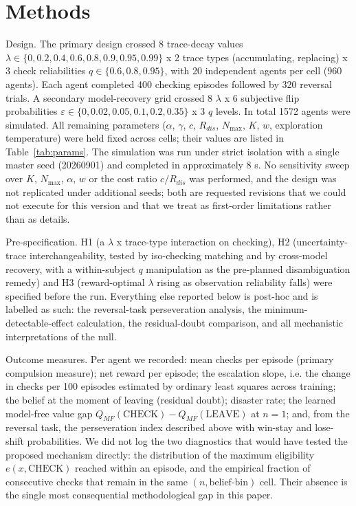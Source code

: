 \documentclass[11pt,a4paper]{article}
\begin{document}
\section{Methods}
Design. The primary design crossed 8 trace-decay values $\lambda \in \{0, 0.2, 0.4, 0.6, 0.8, 0.9, 0.95, 0.99\}$ x 2 trace types (accumulating, replacing) x 3 check reliabilities $q \in \{0.6, 0.8, 0.95\}$, with 20 independent agents per cell (960 agents). Each agent completed 400 checking episodes followed by 320 reversal trials. A secondary model-recovery grid crossed 8 $\lambda$ x 6 subjective flip probabilities $\varepsilon \in \{0, 0.02, 0.05, 0.1, 0.2, 0.35\}$ x 3 $q$ levels. In total 1572 agents were simulated. All remaining parameters ($\alpha$, $\gamma$, $c$, $R_{dis}$, $N_{\max}$, $K$, $w$, exploration temperature) were held fixed across cells; their values are listed in Table~\ref{tab:params}. The simulation was run under strict isolation with a single master seed (20260901) and completed in approximately 8 s. No sensitivity sweep over $K$, $N_{\max}$, $\alpha$, $w$ or the cost ratio $c/R_{dis}$ was performed, and the design was not replicated under additional seeds; both are requested revisions that we could not execute for this version and that we treat as first-order limitations rather than as details.

Pre-specification. H1 (a $\lambda$ x trace-type interaction on checking), H2 (uncertainty-trace interchangeability, tested by iso-checking matching and by cross-model recovery, with a within-subject $q$ manipulation as the pre-planned disambiguation remedy) and H3 (reward-optimal $\lambda$ rising as observation reliability falls) were specified before the run. Everything else reported below is post-hoc and is labelled as such: the reversal-task perseveration analysis, the minimum-detectable-effect calculation, the residual-doubt comparison, and all mechanistic interpretations of the null.

Outcome measures. Per agent we recorded: mean checks per episode (primary compulsion measure); net reward per episode; the escalation slope, i.e. the change in checks per 100 episodes estimated by ordinary least squares across training; the belief at the moment of leaving (residual doubt); disaster rate; the learned model-free value gap $Q_{MF}(\mathrm{CHECK}) - Q_{MF}(\mathrm{LEAVE})$ at $n=1$; and, from the reversal task, the perseveration index described above with win-stay and lose-shift probabilities. We did not log the two diagnostics that would have tested the proposed mechanism directly: the distribution of the maximum eligibility $e(x,\mathrm{CHECK})$ reached within an episode, and the empirical fraction of consecutive checks that remain in the same $(n, \text{belief-bin})$ cell. Their absence is the single most consequential methodological gap in this paper.
\end{document}
